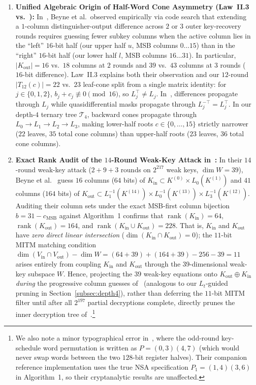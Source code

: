 \documentclass[11pt,a4paper]{article}
\theoremstyle{definition}
\theoremstyle{remark}
\newcommand{\rank}{\operatorname{rank}}
\begin{document}
\begin{enumerate}[leftmargin=1.8em]
    \item \textbf{Unified Algebraic Origin of Half-Word Cone Asymmetry (Law~II.3 vs.~\cite[Table~5]{BNS26}):}
    In~\cite[$\S$5.1, Table~5]{BNS26}, Beyne et al.\ observed empirically via code search that extending a $1$-column distinguisher-output difference across $2$ or $3$ outer key-recovery rounds requires guessing fewer subkey columns when the active column lies in the ``left'' $16$-bit half (our upper half $u$, MSB columns $0\dots 15$) than in the ``right'' $16$-bit half (our lower half $l$, MSB columns $16\dots 31$). In particular, $|K_{\text{out}}| = 16$ vs.\ $18$ columns at $2$ rounds and $39$ vs.\ $43$ columns at $3$ rounds ($16$-bit difference). Law~II.3 explains both their observation and our $12$-round $|T_{12}(c)| = 22$ vs.\ $23$ leaf-cone split from a single matrix identity: for $j \in \{0,1,2\}$, $b_j + c_j \not\equiv 0 \pmod{16}$, so $L_j^\top \neq L_j$. In~\cite{BNS26}, differences propagate through $L_j$ while quasidifferential masks propagate through $L_j^{-\top} = L_j^\top$. In our depth-$4$ ternary tree $\mathcal{T}_4$, backward cones propagate through $L_0 \to L_1 \to L_2 \to L_3$, making lower-half roots $c \in \{0,\dots,15\}$ strictly narrower ($22$ leaves, $35$ total cone columns) than upper-half roots ($23$ leaves, $36$ total cone columns).
    \item \textbf{Exact Rank Audit of the $14$-Round Weak-Key Attack in~\cite[$\S$6.2]{BNS26}:}
    In their $14$-round weak-key attack ($2 + 9 + 3$ rounds on $2^{217}$ weak keys, $\dim W = 39$), Beyne et al.~\cite[Tables~11--12, p.~19]{BNS26} guess $16$ columns ($64$ bits) of $K_{\text{in}} \subset K^{(0)} \times L_0(K^{(1)})$ and $41$ columns ($164$ bits) of $K_{\text{out}} \subset L_1^{-1}(K^{(14)}) \times L_0^{-1}(K^{(13)}) \times L_3^{-1}(K^{(12)})$. Auditing their column sets under the exact MSB-first column bijection $b = 31 - c_{\text{MSB}}$ against Algorithm~1 confirms that $\rank(K_{\text{in}}) = 64$, $\rank(K_{\text{out}}) = 164$, and $\rank(K_{\text{in}} \cup K_{\text{out}}) = 228$. That is, $K_{\text{in}}$ and $K_{\text{out}}$ have \emph{zero direct linear intersection} ($\dim(K_{\text{in}} \cap K_{\text{out}}) = 0$); the $11$-bit MITM matching condition $\dim(V_{\text{in}} \cap V_{\text{out}}) - \dim W = (64 + 39) + (164 + 39) - 256 - 39 = 11$ arises entirely from coupling $K_{\text{in}}$ and $K_{\text{out}}$ through the $39$-dimensional weak-key subspace $W$. Hence, projecting the $39$ weak-key equations onto $K_{\text{out}} \oplus K_{\text{in}}$ \emph{during} the progressive column guesses of~\cite[Table~12]{BNS26} (analogous to our $L_t$-guided pruning in Section~\ref{subsec:depth4}), rather than deferring the $11$-bit MITM filter until after all $2^{197}$ partial decryptions complete, directly prunes the inner decryption tree of~\cite[$\S$6.2]{BNS26}.\footnote{We also note a minor typographical error in~\cite[$\S$2.2, p.~4]{BNS26}, where the odd-round key-schedule word permutation is written as $P = (0, 3)(4, 7)$ (which would never swap words between the two $128$-bit register halves). Their companion reference implementation uses the true NSA specification $P_1 = (1, 4)(3, 6)$ in Algorithm~1, so their cryptanalytic results are unaffected.}
\end{enumerate}
\end{document}
